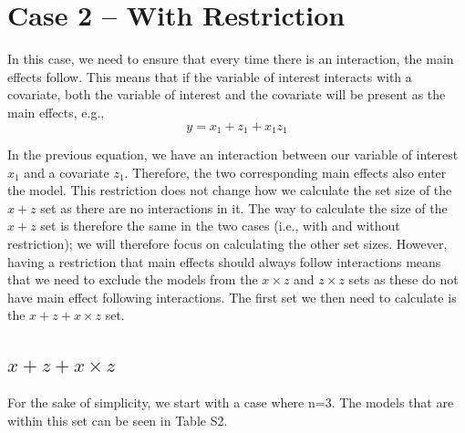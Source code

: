 \section{Case 2 – With Restriction}

In this case, we need to ensure that every time there is an interaction, the main effects follow. This means that if the variable of interest interacts with a covariate, both the variable of interest and the covariate will be present as the main effects, e.g.,
\[y=x_1+z_1+x_1z_1\] 

In the previous equation, we have an interaction between our variable of interest $x_1$ and a covariate $z_1$. Therefore, the two corresponding main effects also enter the model. This restriction does not change how we calculate the set size of the $x + z$ set as there are no interactions in it. The way to calculate the size of the $x + z$ set is therefore the same in the two cases (i.e., with and without restriction); we will therefore focus on calculating the other set sizes. However, having a restriction that main effects should always follow interactions means that we need to exclude the models from the $x \times z$ and $z \times z$ sets as these do not have main effect following interactions. The first set we then need to calculate is the $x + z + x \times z$ set.

\subsection{$x + z + x \times z$}
For the sake of simplicity, we start with a case where n=3. The models that are within this set can be seen in Table S2. \\

